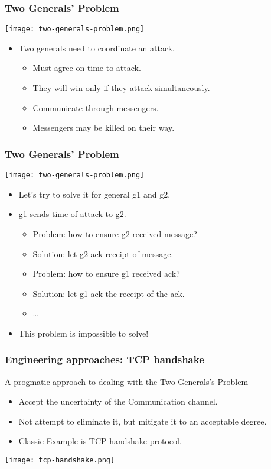 \begin{frame}
    \frametitle{Two Generals' Problem}
    \texttt{[image: two-generals-problem.png]}
    \begin{itemize}
        \item \alert{Two generals} need to coordinate an attack.
            \begin{itemize}
                \item Must \alert{agree} on time to attack.
                \item They will win only if they attack \alert{simultaneously}.
                \item Communicate through \alert{messengers}.
                \item Messengers may be \alert{killed} on their way.
            \end{itemize}
    \end{itemize}
\end{frame}

\begin{frame}
    \frametitle{Two Generals' Problem}
    \texttt{[image: two-generals-problem.png]}
    \begin{itemize}
        \item Let's try to solve it for general g1 and g2.
        \item g1 sends \alert{time of attack} to g2.
            \begin{itemize}
                \item \alert{Problem}: how to ensure g2 received message?
                \item \alert{Solution}: let g2 ack receipt of message.
                \item \alert{Problem}: how to ensure g1 received ack?
                \item \alert{Solution}: let g1 ack the receipt of the ack.
                \item \ldots
            \end{itemize}
        \item This problem is \alert{impossible} to solve!
    \end{itemize}
\end{frame}

\begin{frame}
    \frametitle{Engineering approaches: TCP handshake}
    A progmatic approach to dealing with the Two Generals's Problem
    \begin{itemize}
        \item Accept the \alert{uncertainty} of the Communication channel.
        \item Not attempt to eliminate it, but mitigate it to an acceptable degree.
        \item Classic Example is TCP handshake protocol.
    \end{itemize}
    \texttt{[image: tcp-handshake.png]}
\end{frame}
